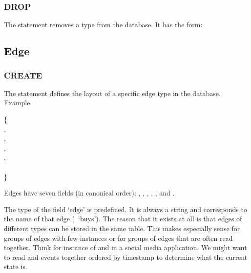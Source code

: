 \subsubsection{DROP}
The  statement removes a type
from the database. 
It has the form:

 

\subsection{Edge}
\subsubsection{CREATE}
The  statement defines the layout
of a specific edge type in the database.
Example:

  \{ \\
\hspace*{1cm}    , \\
\hspace*{1cm}    , \\
\hspace*{1cm}  , \\
\hspace*{1cm}    , \\
\hspace*{1cm}     \\
\}

Edges have seven fields (in canonical order):
,
, ,
, ,
 and .

The type of the field `edge' is predefined.
It is always a string and corresponds to the
name of that edge (\eg\ `buys').
The reason that it exists at all
is that edges of different types can be stored
in the same table.
This makes especially sense for groups of edges
with few instances or for groups of edges
that are often read together.
Think for instance of  and 
in a social media application.
We might want to read  and 
events together ordered by timestamp to determine
what the current state is.

